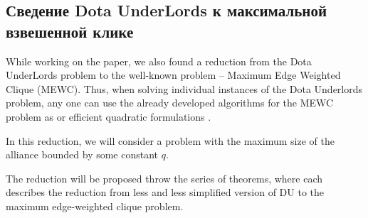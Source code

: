 \documentclass{article}
\begin{document}
\subsection{Сведение Dota UnderLords к максимальной взвешенной клике}
While working on the paper, we also found a reduction from the Dota UnderLords problem to the well-known problem -- Maximum Edge Weighted Clique (MEWC). Thus, when solving individual instances of the Dota Underlords problem, any one can use the already developed algorithms for the MEWC problem as \cite{san2019new} or efficient quadratic formulations    \cite{hosseinian2017maximum}.

In this reduction, we will consider a problem with the maximum size of the alliance bounded by some constant $q$.

The reduction will be proposed throw the series of theorems, where each describes the reduction from less and  less simplified version of DU to the maximum edge-weighted clique problem.
\end{document}
